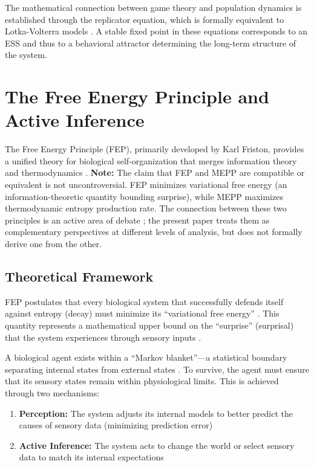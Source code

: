 \documentclass[12pt,a4paper]{article}
\theoremstyle{remark}
\begin{document}
The mathematical connection between game theory and population dynamics is established through the replicator equation, which is formally equivalent to Lotka-Volterra models \citep{CoexistenceLotkaVolterra}. A stable fixed point in these equations corresponds to an ESS and thus to a behavioral attractor determining the long-term structure of the system.

\section{The Free Energy Principle and Active Inference}
\label{sec:fep}

The Free Energy Principle (FEP), primarily developed by Karl Friston, provides a unified theory for biological self-organization that merges information theory and thermodynamics \citep{FristonFreeEnergy,FristonPDF}. \textbf{Note:} The claim that FEP and MEPP are compatible or equivalent is not uncontroversial. FEP minimizes variational free energy (an information-theoretic quantity bounding surprise), while MEPP maximizes thermodynamic entropy production rate. The connection between these two principles is an active area of debate \citep{FristonFreeEnergy}; the present paper treats them as complementary perspectives at different levels of analysis, but does not formally derive one from the other.

\subsection{Theoretical Framework}

FEP postulates that every biological system that successfully defends itself against entropy (decay) must minimize its ``variational free energy'' \citep{FristonFreeEnergy}. This quantity represents a mathematical upper bound on the ``surprise'' (surprisal) that the system experiences through sensory inputs \citep{FristonFreeEnergy}.

A biological agent exists within a ``Markov blanket''---a statistical boundary separating internal states from external states \citep{FristonPDF}. To survive, the agent must ensure that its sensory states remain within physiological limits. This is achieved through two mechanisms:

\begin{enumerate}
    \item \textbf{Perception:} The system adjusts its internal models to better predict the causes of sensory data (minimizing prediction error) \citep{FristonFreeEnergy}
    \item \textbf{Active Inference:} The system acts to change the world or select sensory data to match its internal expectations \citep{FristonFreeEnergy}
\end{enumerate}
\end{document}
